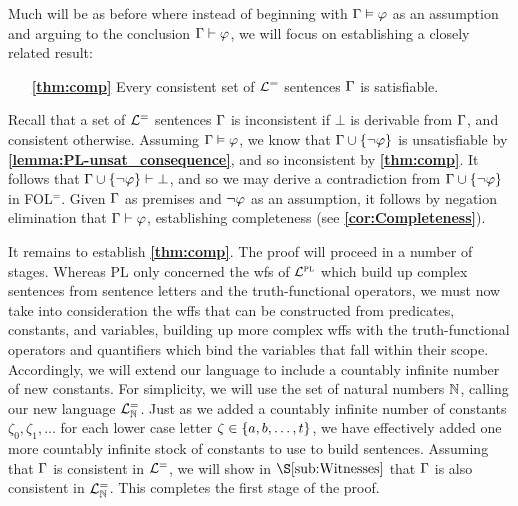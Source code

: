 Much will be as before where instead of beginning with $\Gamma\vDash\varphi$ as an assumption and arguing to the conclusion $\Gamma\vdash\varphi$, we will focus on establishing a closely related result: 
\begin{enumerate}[leftmargin=1.5in]
  \item[\textbf{\ref{thm:comp}}] Every consistent set of $\mathcal{L}^{=}$ sentences $\Gamma$ is satisfiable. 
\end{enumerate}
Recall that a set of $\mathcal{L}^{=}$ sentences $\Gamma$ is inconsistent if $\bot$ is derivable from $\Gamma$, and consistent otherwise.
Assuming $\Gamma\vDash\varphi$, we know that $\Gamma\cup\lbrace\neg\varphi\rbrace$ is unsatisfiable by \textbf{\ref{lemma:PL-unsat_consequence}}, and so inconsistent by \textbf{\ref{thm:comp}}.
It follows that $\Gamma\cup\lbrace\neg\varphi\rbrace\vdash\bot$, and so we may derive a contradiction from $\Gamma\cup\lbrace\neg\varphi\rbrace$ in FOL$^=$.
Given $\Gamma$ as premises and $\neg\varphi$ as an assumption, it follows by negation elimination that $\Gamma \vdash \varphi$, establishing completeness (see \textbf{\ref{cor:Completeness}}).

It remains to establish \textbf{\ref{thm:comp}}.
The proof will proceed in a number of stages.
Whereas PL only concerned the wfs of $\mathcal{L}^{\textsc{pl}}$ which build up complex sentences from sentence letters and the truth-functional operators, we must now take into consideration the wffs that can be constructed from predicates, constants, and variables, building up more complex wffs with the truth-functional operators and quantifiers which bind the variables that fall within their scope.
Accordingly, we will extend our language to include a countably infinite number of new constants.
For simplicity, we will use the set of natural numbers $\mathbb{N}$, calling our new language $\mathcal{L}^{=}_{\mathbb{N}}$. 
Just as we added a countably infinite number of constants $\zeta_0, \zeta_1, \ldots$ for each lower case letter $\zeta \in \lbrace a, b, \ldots, t\rbrace$, we have effectively added one more countably infinite stock of constants to use to build sentences.
Assuming that $\Gamma$ is consistent in $\mathcal{L}^{=}$, we will show in $\S\ref{sub:Witnesses}$ that $\Gamma$ is also consistent in $\mathcal{L}^{=}_{\mathbb{N}}$.
This completes the first stage of the proof.

